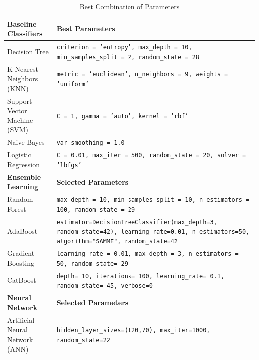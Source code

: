 \documentclass[pt]{article}  %
\begin{document}
\begin{table}[htbp]
    \centering
     \begin{tabular}{|l|p{10cm}|} %
        \hline
        \textbf{Baseline Classifiers} & \textbf{Best Parameters} \\ \hline
        Decision Tree & \texttt{criterion = 'entropy', max\_depth = 10, min\_samples\_split = 2, random\_state = 28} \\ \hline
        K-Nearest Neighbors (KNN) & \texttt{metric = 'euclidean', n\_neighbors = 9, weights = 'uniform'} \\ \hline
        Support Vector Machine (SVM) & \texttt{C = 1, gamma = 'auto', kernel = 'rbf'} \\ \hline
        Naive Bayes & \texttt{var\_smoothing = 1.0} \\ \hline
        Logistic Regression & \texttt{C = 0.01, max\_iter = 500, random\_state = 20, solver = 'lbfgs'} \\ \hline
        \textbf{Ensemble Learning} & \textbf{Selected Parameters} \\ \hline
        Random Forest & \texttt{max\_depth = 10, min\_samples\_split =  10, n\_estimators = 100, random\_state = 29} \\ \hline
        AdaBoost & \texttt{estimator=DecisionTreeClassifier(max\_depth=3, random\_state=42),
    learning\_rate=0.01,
    n\_estimators=50,
    algorithm="SAMME",
    random\_state=42} \\ \hline
        Gradient Boosting & \texttt{learning\_rate = 0.01, max\_depth = 3, n\_estimators = 50, random\_state= 29} \\ \hline
        CatBoost & \texttt{depth= 10, iterations= 100, learning\_rate= 0.1, random\_state= 45, verbose=0} \\ \hline
        \textbf{Neural Network} & \textbf{Selected Parameters} \\
        \hline
        Artificial Neural Network (ANN) & \texttt{hidden\_layer\_sizes=(120,70), max\_iter=1000, random\_state=22} \\ \hline
       
    \end{tabular}
    \caption{Best Combination of Parameters}
    \label{tab:table3}
\end{table}
\end{document}
